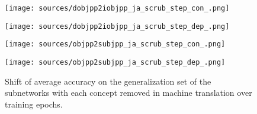 \begin{figure*}[t]
    \centering
    \begin{minipage}[b]{0.245\linewidth}
    \centering
    \texttt{[image: sources/dobjpp2iobjpp\_ja\_scrub\_step\_con\_.png]}
    \end{minipage}
    \begin{minipage}[b]{0.245\linewidth}
    \centering
    \texttt{[image: sources/dobjpp2iobjpp\_ja\_scrub\_step\_dep\_.png]}
    \end{minipage}
    \begin{minipage}[b]{0.245\linewidth}
    \centering
    \texttt{[image: sources/objpp2subjpp\_ja\_scrub\_step\_con\_.png]}
    \end{minipage}
    \begin{minipage}[b]{0.245\linewidth}
    \centering
    \texttt{[image: sources/objpp2subjpp\_ja\_scrub\_step\_dep\_.png]}
    \end{minipage}
    \caption{Shift of average accuracy on the generalization set of the subnetworks with each concept removed in machine translation over training epochs.}
    \label{fig:results_causal_epoch}
\end{figure*}